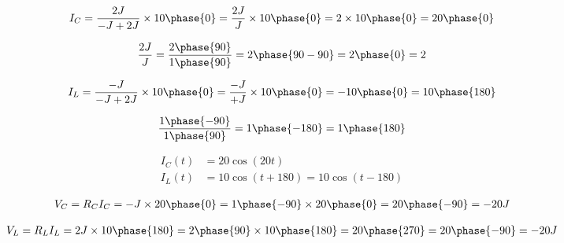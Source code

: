 \documentclass[12pt]{book}
\begin{document}
\begin{align*}
I_{C} = \frac{2J}{-J + 2J} \times 10 \phase{0} = \frac{2J}{J} \times 10 \phase{0} = 2 \times 10 \phase{0} = 20 \phase{0}
\end{align*}


\begin{align*}
\frac{2J}{J} = \frac{2 \phase{90}}{1 \phase{90}} = 2 \phase{90 - 90} = 2 \phase{0} = 2
\end{align*}





\begin{align*}
I_{L} = \frac{-J}{-J + 2J} \times 10 \phase{0} = \frac{-J}{+J} \times 10 \phase{0} = -10 \phase{0} = 10 \phase{180}
\end{align*}



\begin{align*}
\frac{1\phase{-90}}{1\phase{90}} = 1 \phase{-180} = 1 \phase{180}
\end{align*}


\begin{align*}
I_{C}(t) &= 20 \cos{(20t)} \\
I_{L}(t) &= 10 \cos{(t + 180)} = 10 \cos{(t - 180)}
\end{align*}



\begin{align*}
V_{C} = R_{C} I_{C} = -J \times 20 \phase{0} = 1 \phase{-90} \times 20 \phase{0} = 20 \phase{-90} = -20J
\end{align*}




\begin{align*}
V_{L} = R_{L} I_{L} = 2J \times 10 \phase{180} = 2 \phase{90} \times 10 \phase{180} = 20 \phase{270} = 20 \phase{-90} = -20 J
\end{align*}





\begin{center}
\end{center}
\end{document}
